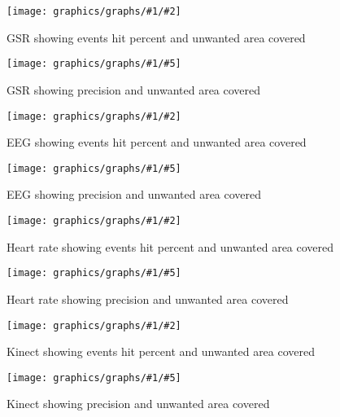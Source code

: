 \newcommand{\fuckinggraph}[7]{
    \begin{figure}[h!]
    \begin{minipage}[t]{0.5\textwidth}
        \texttt{[image: graphics/graphs/\#1/\#2]}
        \caption{#3}
        \label{#4}
    \end{minipage}
    \hspace*{\fill} %
    \begin{minipage}[t]{0.5\textwidth}
        \texttt{[image: graphics/graphs/\#1/\#5]}
        \caption{#6}
        \label{#7}
    \end{minipage}
    \end{figure}
}

\newcommand{\fuckinggraphevenidontwanttorepeatmyself}[6]{ %
  \fuckinggraph{#1}
  {False_cover_rate_(FCR)-Events_hit_rate_(EHR)-CovNu-#2.pdf}{#3}{#4}
  {False_cover_rate_(FCR)-Precision-CovNu-#2.pdf}{#5}{#6}
}

\fuckinggraphevenidontwanttorepeatmyself{short}{GSR}
{GSR showing events hit percent and unwanted area covered}{lab:gsr_event_ehr}
{GSR showing precision and unwanted area covered}         {lab:gsr_pres_ehr}

\fuckinggraphevenidontwanttorepeatmyself{short}{EEG}
{EEG showing events hit percent and unwanted area covered}{lab:eeg_event_ehr}
{EEG showing precision and unwanted area covered}         {lab:eeg_pres_ehr}

\fuckinggraphevenidontwanttorepeatmyself{short}{HR}
{Heart rate showing events hit percent and unwanted area covered}{lab:hr_event_ehr}
{Heart rate showing precision and unwanted area covered}         {lab:hr_pres_ehr}

\fuckinggraphevenidontwanttorepeatmyself{short}{FACE}
{Kinect showing events hit percent and unwanted area covered}{lab:face_event_ehr}
{Kinect showing precision and unwanted area covered}         {lab:face_pres_ehr}